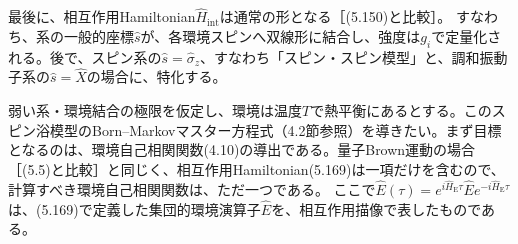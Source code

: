 最後に、相互作用Hamiltonian$\hat H_{\mathrm{int}}$は通常の形となる［(5.150)と比較］。
すなわち、系の一般的座標$\hat s$が、各環境スピンへ双線形に結合し、強度は$g_i$で定量化される。後で、スピン系の$\hat s=\hat\sigma_z$、すなわち「スピン・スピン模型」と、調和振動子系の$\hat s=\hat X$の場合に、特化する。

弱い系・環境結合の極限を仮定し、環境は温度$T$で熱平衡にあるとする。このスピン浴模型のBorn--Markovマスター方程式（4.2節参照）を導きたい。まず目標となるのは、環境自己相関関数(4.10)の導出である。量子Brown運動の場合［(5.5)と比較］と同じく、相互作用Hamiltonian(5.169)は一項だけを含むので、計算すべき環境自己相関関数は、ただ一つである。
\hypertarget{srcpage:230}{}\label{srcpage:230}
ここで$\hat E(\tau)=e^{i\hat H_{\mathrm E}\tau}\hat E e^{-i\hat H_{\mathrm E}\tau}$は、(5.169)で定義した集団的環境演算子$\hat E$を、相互作用描像で表したものである。

